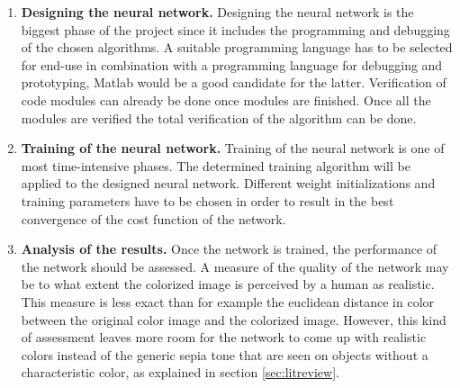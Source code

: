 \begin{enumerate}
\item \textbf{Designing the neural network.}
 Designing the neural network is the biggest phase of the project since it includes the programming and debugging of the chosen algorithms. A suitable programming language has to be selected for end-use in combination with a programming language for debugging and prototyping, Matlab would be a good candidate for the latter. Verification of code modules can already be done once modules are finished. Once all the modules are verified the total verification of the algorithm can be done.
\item \textbf{Training of the neural network.}
Training of the neural network is one of most time-intensive phases. The determined training algorithm will be applied to the designed neural network. Different weight initializations and training parameters have to be chosen in order to result in the best convergence of the cost function of the network. 

\item \textbf{Analysis of the results.}
Once the network is trained, the performance of the network should be assessed. A measure of the quality of the network may be to what extent the colorized image is perceived by a human as realistic. This measure is less exact than for example the euclidean distance in color between the original color image and the colorized image. However, this kind of assessment leaves more room for the network to come up with realistic colors instead of the generic sepia tone that are seen on objects without a characteristic color, as explained in section \ref{sec:litreview}.
\end{enumerate}





